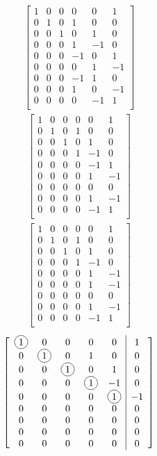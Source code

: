 \documentclass[a4paper,11pt]{article}
\newcommand*\circled[1]{\tikz[baseline=(char.base)]{
             \node[shape=circle,draw,inner sep=2pt] (char) {#1};}}
\begin{document}
\begin{align}
\left[
\begin{array}{ccccc|c}
1 & 0 & 0 & 0 & 0 & 1  \\
0 & 1 & 0 & 1 & 0 & 0  \\
0 & 0 & 1 & 0 & 1 & 0  \\
0 & 0 & 0 & 1 & -1 & 0  \\
0 & 0 & 0 & -1 & 0 & 1  \\
0 & 0 & 0 & 0 & 1 & -1  \\
0 & 0 & 0 & -1 & 1 & 0  \\
0 & 0 & 0 & 1 & 0 & -1  \\
0 & 0 & 0 & 0 & -1 & 1  \\
\end{array}
\right]
\end{align}
\begin{align}
\left[
\begin{array}{ccccc|c}
1 & 0 & 0 & 0 & 0 & 1  \\
0 & 1 & 0 & 1 & 0 & 0  \\
0 & 0 & 1 & 0 & 1 & 0  \\
0 & 0 & 0 & 1 & -1 & 0  \\
0 & 0 & 0 & 0 & -1 & 1  \\
0 & 0 & 0 & 0 & 1 & -1  \\
0 & 0 & 0 & 0 & 0 & 0  \\
0 & 0 & 0 & 0 & 1 & -1  \\
0 & 0 & 0 & 0 & -1 & 1  \\
\end{array}
\right]
\end{align}
\begin{align}
\left[
\begin{array}{ccccc|c}
1 & 0 & 0 & 0 & 0 & 1  \\
0 & 1 & 0 & 1 & 0 & 0  \\
0 & 0 & 1 & 0 & 1 & 0  \\
0 & 0 & 0 & 1 & -1 & 0  \\
0 & 0 & 0 & 0 & 1 & -1  \\
0 & 0 & 0 & 0 & 1 & -1  \\
0 & 0 & 0 & 0 & 0 & 0  \\
0 & 0 & 0 & 0 & 1 & -1  \\
0 & 0 & 0 & 0 & -1 & 1  \\
\end{array}
\right]
\end{align}
\begin{align}
\left[
\begin{array}{ccccc|c}
\circled{1} & 0 & 0 & 0 & 0 & 1  \\
0 & \circled{1} & 0 & 1 & 0 & 0  \\
0 & 0 & \circled{1} & 0 & 1 & 0  \\
0 & 0 & 0 & \circled{1} & -1 & 0  \\
0 & 0 & 0 & 0 & \circled{1} & -1  \\
0 & 0 & 0 & 0 & 0 & 0  \\
0 & 0 & 0 & 0 & 0 & 0  \\
0 & 0 & 0 & 0 & 0 & 0  \\
0 & 0 & 0 & 0 & 0 & 0  \\
\end{array}
\right]
\end{align}
\end{document}
